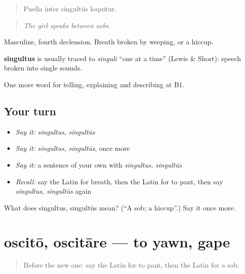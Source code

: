 \begin{quote}
Puella inter singultūs loquitur.
\end{quote}

\begin{quote}
\emph{The girl speaks between sobs.}
\end{quote}

Masculine, fourth declension. Breath broken by weeping, or a hiccup.

\begin{cousinweb}
\textbf{singultus} is usually traced to \emph{singulī} \textquotedblleft{}one at a time\textquotedblright{} (Lewis \& Short): speech broken into single sounds.
\end{cousinweb}

\begin{grammarlens}[title={What you've built}]
One more word for telling, explaining and describing at B1.
\end{grammarlens}

\subsection*{Your turn}
\begin{itemize}
\raggedright
  \item \emph{Say it:} \emph{singultus, singultūs}
  \item \emph{Say it:} \emph{singultus, singultūs}, once more
  \item \emph{Say it:} a sentence of your own with \emph{singultus, singultūs}
  \item \emph{Recall:} say the Latin for breath, then the Latin for to pant, then say \emph{singultus, singultūs} again
\end{itemize}

\begin{tcolorbox}[breakable,colback=teal!4,colframe=teal!35!black,title={Before you move on}]
What does singultus, singultūs mean? (\textquotedblleft{}A sob; a hiccup\textquotedblright{}.) Say it once more.
\end{tcolorbox}
\section[oscitō, oscitāre]{oscitō, oscitāre — to yawn, gape}

\label{lesson:LA-C520-oscito}



\begin{quote}
Before the new one: say the Latin for to pant, then the Latin for a sob.
\end{quote}

